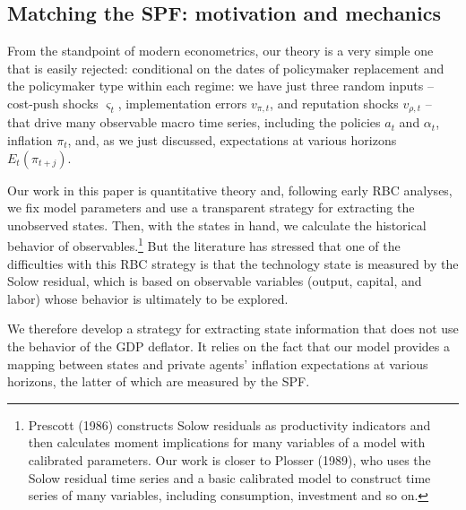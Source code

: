 \documentclass[12pt,letter,leqno]{article}
\theoremstyle{asn}
\theoremstyle{lem}
\theoremstyle{slem}
\theoremstyle{prop}
\theoremstyle{appprop}
\theoremstyle{rem}
\theoremstyle{defn}
\begin{document}
\subsection{Matching the SPF: motivation and mechanics}\label{app:extractstate}

From the standpoint of modern econometrics, our theory is a very simple one
that is easily rejected: conditional on the dates of policymaker replacement and the
policymaker type within each regime: we have just three
random inputs -- cost-push shocks $\varsigma _{t}$, implementation errors $v_{\pi,t}$, and reputation shocks $v_{\rho,t}$ -- that drive many observable macro time series, including the policies $a_{t}$ and $\alpha _{t}$, inflation $\pi _{t}$, and, as we just discussed, expectations at various horizons $E_t(\pi_{t+j})$.

Our work in this paper is quantitative theory and, following early RBC
analyses, we fix model parameters and use a transparent strategy for
extracting the unobserved states. Then, with the states in hand, we
calculate the historical behavior of observables.\footnote{%
Prescott (1986) constructs Solow residuals as productivity indicators and
then calculates moment implications for many variables of a model with
calibrated parameters. Our work is closer to Plosser (1989), who uses the
Solow residual time series and a basic calibrated model to construct time
series of many variables, including consumption, investment and so on.} But
the literature has stressed that one of the difficulties with this RBC
strategy is that the technology state is measured by the Solow residual,
which is based on observable variables (output, capital, and labor) whose
behavior is ultimately to be explored. 

We therefore develop a strategy for extracting state information that does
not use the behavior of the GDP deflator.
It relies on the fact that our model provides a
mapping between states and private agents' inflation expectations at various horizons, the latter of which are measured by the SPF.
\end{document}
